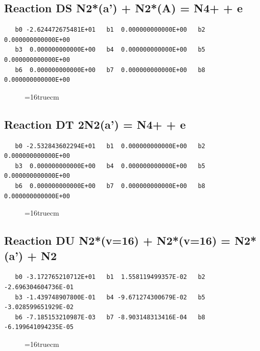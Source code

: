\documentclass[12pt,dvipdfm]{article}
\begin{document}
\subsection{
Reaction DS N2*(a') + N2*(A) = N4+ + e }
\begin{small}\begin{verbatim}
   b0 -2.624472675481E+01   b1  0.000000000000E+00   b2  0.000000000000E+00
   b3  0.000000000000E+00   b4  0.000000000000E+00   b5  0.000000000000E+00
   b6  0.000000000000E+00   b7  0.000000000000E+00   b8  0.000000000000E+00
\end{verbatim}\end{small}
\begin{figure}[h!] \label{n2rates}
\epsfxsize=16truecm
\end{figure}
\newpage

\subsection{
Reaction DT 2N2(a') = N4+ + e }
\begin{small}\begin{verbatim}
   b0 -2.532843602294E+01   b1  0.000000000000E+00   b2  0.000000000000E+00
   b3  0.000000000000E+00   b4  0.000000000000E+00   b5  0.000000000000E+00
   b6  0.000000000000E+00   b7  0.000000000000E+00   b8  0.000000000000E+00
\end{verbatim}\end{small}
\begin{figure}[h!] \label{n2rates}
\epsfxsize=16truecm
\end{figure}
\newpage

\subsection{
Reaction DU N2*(v=16) + N2*(v=16) = N2*(a') + N2 }
\begin{small}\begin{verbatim}
   b0 -3.172765210712E+01   b1  1.558119499357E-02   b2 -2.696304604736E-01
   b3 -1.439748907800E-01   b4 -9.671274300679E-02   b5 -3.028599651929E-02
   b6 -7.185153210987E-03   b7 -8.903148313416E-04   b8 -6.199641094235E-05
\end{verbatim}\end{small}
\begin{figure}[h!] \label{n2rates}
\epsfxsize=16truecm
\end{figure}
\newpage
\end{document}

